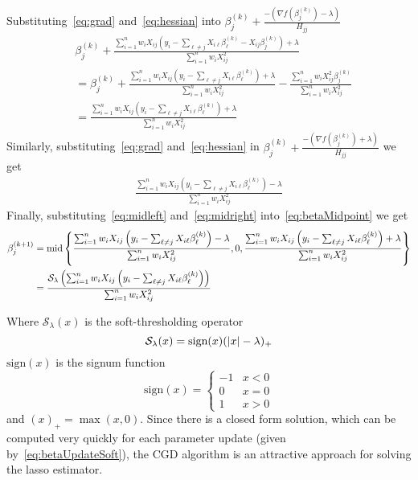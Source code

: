 Substituting~\eqref{eq:grad} and~\eqref{eq:hessian} into $\beta_j^{(k)}+ \frac{-(\nabla f(\beta_j^{(k)}) - \lambda)}{H_{jj}}$ %
\begin{align}
& \beta_j^{(k)}+ \frac{  \sum_{i=1}^{n} w_i X_{ij}\left(  y_i - \sum_{\ell \neq j}X_{i\ell} \beta_\ell^{(k)} - X_{ij}\beta_j^{(k)} \right)  + \lambda }{\sum_{i=1}^{n} w_i X_{ij}^2} \nonumber \\
& = \beta_j^{(k)}+ \frac{ \sum_{i=1}^{n} w_i X_{ij}\left(  y_i - \sum_{\ell \neq j}X_{i\ell} \beta_\ell^{(k)} \right) + \lambda}{\sum_{i=1}^{n} w_i X_{ij}^2} - \frac{\sum_{i=1}^{n} w_i X_{ij}^2\beta_j^{(k)}  }{\sum_{i=1}^{n} w_i X_{ij}^2} \nonumber \\
& =  \frac{  \sum_{i=1}^{n} w_i X_{ij}\left(  y_i - \sum_{\ell \neq j}X_{i\ell} \beta_\ell^{(k)} \right) + \lambda}{\sum_{i=1}^{n} w_i X_{ij}^2} \label{eq:midleft}
\end{align}
Similarly, substituting~\eqref{eq:grad} and~\eqref{eq:hessian} in $\beta_j^{(k)}+ \frac{-(\nabla f(\beta_j^{(k)}) + \lambda)}{H_{jj}}$ we get
\begin{align}
\frac{  \sum_{i=1}^{n} w_i X_{ij}\left(  y_i - \sum_{\ell \neq j}X_{i\ell} \beta_\ell^{(k)} \right) - \lambda}{\sum_{i=1}^{n} w_i X_{ij}^2} \label{eq:midright}
\end{align}
Finally, substituting~\eqref{eq:midleft} and~\eqref{eq:midright} into~\eqref{eq:betaMidpoint} we get
\begin{align}
\beta_j^{(k+1)} & = \textrm{{mid}}\left\lbrace \frac{  \sum_{i=1}^{n} w_i X_{ij}\left(  y_i - \sum_{\ell \neq j}X_{i\ell} \beta_\ell^{(k)} \right) - \lambda}{\sum_{i=1}^{n} w_i X_{ij}^2}, 0,\frac{  \sum_{i=1}^{n} w_i X_{ij}\left(  y_i - \sum_{\ell \neq j}X_{i\ell} \beta_\ell^{(k)} \right) + \lambda}{\sum_{i=1}^{n} w_i X_{ij}^2} \right\rbrace \nonumber \\
& = \frac{\mathcal{S}_{\lambda}\left( \sum_{i=1}^{n} w_i X_{ij}\left(  y_i - \sum_{\ell \neq j}X_{i\ell} \beta_\ell^{(k)} \right)\right) }{\sum_{i=1}^{n} w_i X_{ij}^2} \label{eq:betaUpdateSoft}
\end{align}

Where $\mathcal{S}_{\lambda}(x)$ is the soft-thresholding operator
\begin{equation*}
\mathcal{S}_{\lambda}(x) = \textrm{{sign}}(x)(|x| - \lambda)_+
\end{equation*}
$\textrm{sign}(x)$ is the signum function
\begin{equation*}
\textrm{sign}(x) = \begin{cases}
-1 & x<0\\
0 & x= 0\\
1 & x>0
\end{cases}
\end{equation*}
and $(x)_+ = \max(x, 0)$. Since there is a closed form solution, which can be computed very quickly for each parameter update (given by~\eqref{eq:betaUpdateSoft}), the CGD algorithm is an attractive approach for solving the lasso estimator.  


